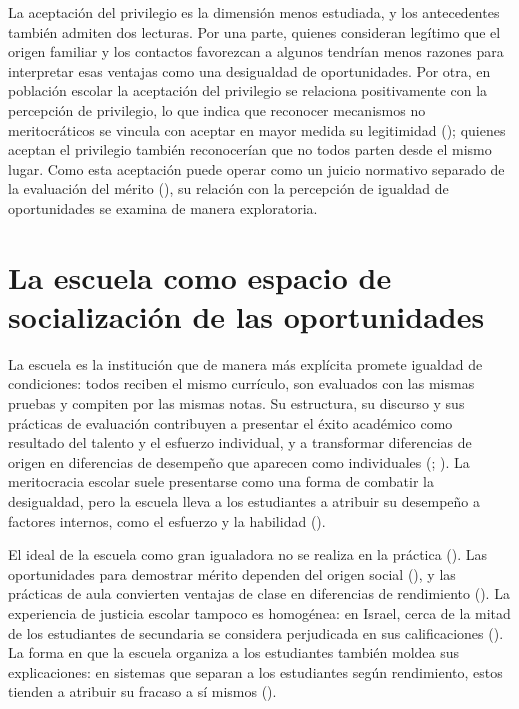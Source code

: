 \documentclass[
  spanish,
  a4paper,
  oneside]{scrbook}
\begin{document}
La aceptación del privilegio es la dimensión menos estudiada, y los
antecedentes también admiten dos lecturas. Por una parte, quienes
consideran legítimo que el origen familiar y los contactos favorezcan a
algunos tendrían menos razones para interpretar esas ventajas como una
desigualdad de oportunidades. Por otra, en población escolar la
aceptación del privilegio se relaciona positivamente con la percepción
de privilegio, lo que indica que reconocer mecanismos no meritocráticos
se vincula con aceptar en mayor medida su legitimidad
(); quienes aceptan
el privilegio también reconocerían que no todos parten desde el mismo
lugar. Como esta aceptación puede operar como un juicio normativo
separado de la evaluación del mérito
(), su relación con
la percepción de igualdad de oportunidades se examina de manera
exploratoria.

\section{La escuela como espacio de socialización de las
oportunidades}\label{la-escuela-como-espacio-de-socializaciuxf3n-de-las-oportunidades}

La escuela es la institución que de manera más explícita promete
igualdad de condiciones: todos reciben el mismo currículo, son evaluados
con las mismas pruebas y compiten por las mismas notas. Su estructura,
su discurso y sus prácticas de evaluación contribuyen a presentar el
éxito académico como resultado del talento y el esfuerzo individual, y a
transformar diferencias de origen en diferencias de desempeño que
aparecen como individuales
(;
). La
meritocracia escolar suele presentarse como una forma de combatir la
desigualdad, pero la escuela lleva a los estudiantes a atribuir su
desempeño a factores internos, como el esfuerzo y la habilidad
().

El ideal de la escuela como gran igualadora no se realiza en la práctica
(). Las oportunidades para demostrar
mérito dependen del origen social (), y las prácticas de aula convierten ventajas de clase en
diferencias de rendimiento (). La experiencia de justicia escolar tampoco es
homogénea: en Israel, cerca de la mitad de los estudiantes de secundaria
se considera perjudicada en sus calificaciones
(). La forma en que la escuela
organiza a los estudiantes también moldea sus explicaciones: en sistemas
que separan a los estudiantes según rendimiento, estos tienden a
atribuir su fracaso a sí mismos
().
\end{document}
